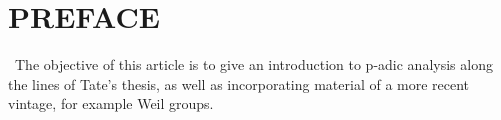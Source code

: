 \chapter*{PREFACE}
\setlength\parindent{2em}


\ \indent The objective of this article is to give an introduction to p-adic analysis along the lines of Tate's thesis, as well as incorporating material of a more recent vintage, for example Weil groups.











